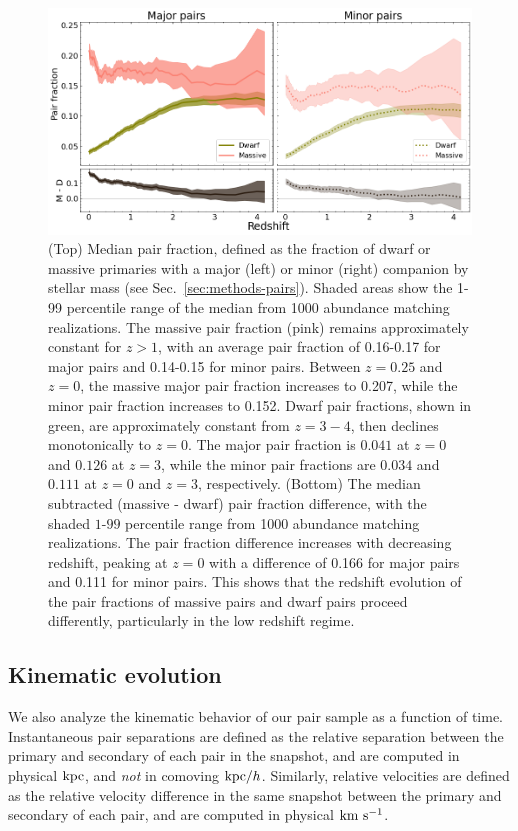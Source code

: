 \documentclass[twocolumn]{aastex631}
\begin{document}
    \label{sec:results}
    \begin{figure}[htp]
      \centering
      \includegraphics[width=\textwidth]{pairfrac_1000.png}
      \caption{
        (Top) Median pair fraction, defined as the fraction of dwarf or massive primaries with a major (left) or minor (right) companion by stellar mass (see Sec.~\ref{sec:methods-pairs}). 
        Shaded areas show the 1-99 percentile range of the median from 1000 abundance matching realizations. 
        The massive pair fraction (pink) remains approximately constant for $z>1$, with an average pair fraction of 0.16-0.17 for major pairs and 0.14-0.15 for minor pairs. Between $z=0.25$ and $z=0$, the massive major pair fraction increases to 0.207, while the minor pair fraction increases to 0.152.
        Dwarf pair fractions, shown in green, are approximately constant from $z=3-4$, then declines monotonically to $z=0$. The major pair fraction is $0.041$ at $z=0$ and $0.126$ at $z=3$, while the minor pair fractions are $0.034$ and $0.111$ at $z=0$ and $z=3$, respectively. 
        (Bottom) The median subtracted (massive - dwarf) pair fraction difference, with the shaded $1$-$99$ percentile range from 1000 abundance matching realizations. The pair fraction difference increases with decreasing redshift, peaking at $z=0$ with a difference of 0.166 for major pairs and 0.111 for minor pairs. This shows that the redshift evolution of the pair fractions of massive pairs and dwarf pairs proceed differently, particularly in the low redshift regime.}
      \label{fig:pairratio}
    \end{figure}

    \subsection{Kinematic evolution}\label{sec:results-kinematics}
    We also analyze the kinematic behavior of our pair sample as a function of time. 
    Instantaneous pair separations are defined as the relative separation between the primary and secondary of each pair in the snapshot, and are computed in physical $\mathrm{kpc}$, and \textit{not} in comoving $\mathrm{kpc}/h$. 
    Similarly, relative velocities are defined as the relative velocity difference in the same snapshot between the primary and secondary of each pair, and are computed in physical $\mathrm{km}~\mathrm{s}^{-1}$.
    
\end{document}
